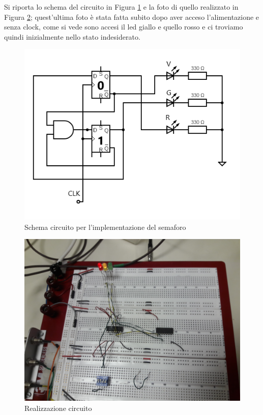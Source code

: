 \documentclass[12pt,a4paper]{article}
\begin{document}
Si riporta lo schema del circuito in Figura \ref{fig:circ} e la foto di quello realizzato in Figura \ref{fig:vg}; quest'ultima foto è stata fatta subito dopo aver acceso l'alimentazione e senza clock, come si vede sono accesi il led giallo e quello rosso e ci troviamo quindi inizialmente nello stato indesiderato. 
\begin{figure}[h]

			\centering

			\includegraphics[scale=0.8]{circuit}

			\caption{ Schema circuito per l'implementazione del semaforo}

			\label{fig:circ}

\end{figure}

\begin{figure}[h]

			\centering

			\includegraphics[scale=0.07]{gr}

			\caption{ Realizzazione circuito}

			\label{fig:vg}

\end{figure}
\end{document}

